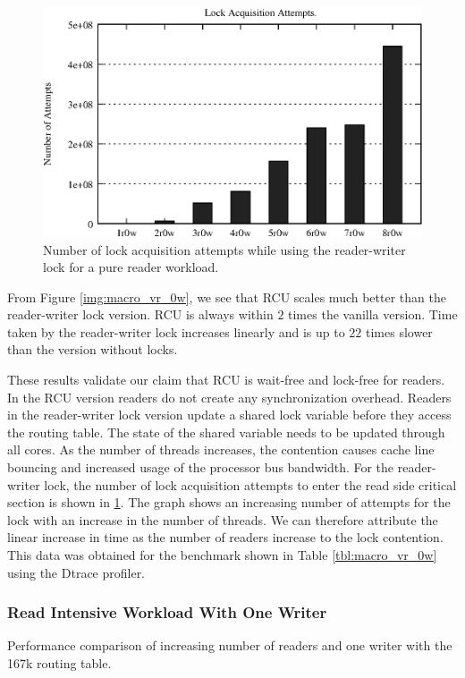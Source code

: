 \documentclass[12pt,a4paper]{article}
\begin{document}
\begin{figure}[tph]
\includegraphics[scale = 0.7]{../images/graphs/profile_lockcount_macro_rwl_vr_0w}
\caption{Number of lock acquisition attempts while using the reader-writer lock for a pure reader workload.}
\label{img:profile_rwl_locks_vr_0w}
\end{figure}

From Figure \ref{img:macro_vr_0w}, we see that RCU scales much better
than the reader-writer lock version. RCU is always within $2$ times
the vanilla version. Time taken by the reader-writer lock increases
linearly and is up to $22$ times slower than the version without
locks.

These results validate our claim that RCU is wait-free and lock-free
for readers. In the RCU version readers do not create any
synchronization overhead. Readers in the reader-writer lock version
update a shared lock variable before they access the routing
table. The state of the shared variable needs to be updated through
all cores. As the number of threads increases, the contention causes
cache line bouncing and increased usage of the processor bus
bandwidth. For the reader-writer lock, the number of lock acquisition attempts to enter
the read side critical section is shown in \ref{img:profile_rwl_locks_vr_0w}. The graph shows an increasing number of attempts for the lock with an increase in the number of threads. We can therefore attribute the  linear increase in time as the number of readers increase to the lock contention. This data was obtained for the benchmark shown in Table \ref{tbl:macro_vr_0w} using the Dtrace profiler. 

\subsubsection{Read Intensive Workload With One Writer}
\begin{table}[tph]
\begin{center}

\end{center}
\caption{Performance comparison of increasing number of readers and one writer with the 167k routing table.}
\label{tbl:macro_vr_1w}
\end{table}
\end{document}
